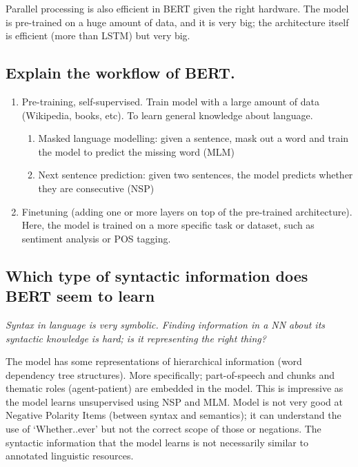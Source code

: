 \documentclass[
  11pt,
  british,
]{article}
\begin{document}
Parallel processing is also efficient in BERT given the right hardware.
The model is pre-trained on a huge amount of data, and it is very big;
the architecture itself is efficient (more than LSTM) but very big.

\hypertarget{explain-the-workflow-of-bert.}{%
\subsection{Explain the workflow of
BERT.}\label{explain-the-workflow-of-bert.}}

\begin{enumerate}
\def\labelenumi{\arabic{enumi}.}
\item
  Pre-training, self-supervised. Train model with a large amount of data
  (Wikipedia, books, etc). To learn general knowledge about language.

  \begin{enumerate}
  \def\labelenumii{\arabic{enumii}.}
  \item
    Masked language modelling: given a sentence, mask out a word and
    train the model to predict the missing word (MLM)
  \item
    Next sentence prediction: given two sentences, the model predicts
    whether they are consecutive (NSP)
  \end{enumerate}
\item
  Finetuning (adding one or more layers on top of the pre-trained
  architecture). Here, the model is trained on a more specific task or
  dataset, such as sentiment analysis or POS tagging.
\end{enumerate}

\hypertarget{which-type-of-syntactic-information-does-bert-seem-to-learn}{%
\subsection{Which type of syntactic information does BERT seem to
learn}\label{which-type-of-syntactic-information-does-bert-seem-to-learn}}

\emph{Syntax in language is very symbolic. Finding information in a NN
about its syntactic knowledge is hard; is it representing the right
thing?}

The model has some representations of hierarchical information (word
dependency tree structures). More specifically; part-of-speech and
chunks and thematic roles (agent-patient) are embedded in the model.
This is impressive as the model learns unsupervised using NSP and MLM.
Model is not very good at Negative Polarity Items (between syntax and
semantics); it can understand the use of `Whether..ever' but not the
correct scope of those or negations. The syntactic information that the
model learns is not necessarily similar to annotated linguistic
resources.
\end{document}
